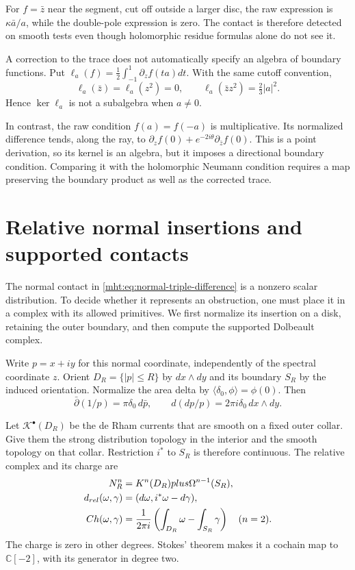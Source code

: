 For $f=\bar z$ near the segment, cut off outside a larger
disc, the raw expression is $\kappa\bar a/a$, while the
double-pole expression is zero. The contact is therefore
detected on smooth tests even though holomorphic residue
formulas alone do not see it.

A correction to the trace does not automatically specify an
algebra of boundary functions. Put
$\ell_a(f)=\frac12\int_{-1}^{1}\partial_zf(ta)dt$.
With the same cutoff convention,
\begin{equation}\label{mht:eq:segment-kernel-defect}
 \ell_a(\bar z)=\ell_a(z^2)=0,
 \qquad \ell_a(\bar z z^2)=\tfrac23|a|^2.
\end{equation}
Hence $\ker\ell_a$ is not a subalgebra when $a\ne0$.

In contrast, the raw condition $f(a)=f(-a)$ is multiplicative.
Its normalized difference tends, along the ray, to
$\partial_zf(0)+e^{-2i\theta}\partial_{\bar z}f(0)$.
This is a point derivation, so its kernel is an algebra, but
it imposes a directional boundary condition. Comparing it
with the holomorphic Neumann condition requires a map
preserving the boundary product as well as the corrected trace.

\section{Relative normal insertions and supported contacts}

The normal contact in \eqref{mht:eq:normal-triple-difference} is a
nonzero scalar distribution. To decide whether it represents an
obstruction, one must place it in a complex with its allowed
primitives. We first normalize its insertion on a disk, retaining the
outer boundary, and then compute the supported Dolbeault complex.

Write $p=x+iy$ for this normal coordinate, independently of the
spectral coordinate $z$. Orient $D_R=\{|p|\leq R\}$ by
$dx\wedge dy$ and its boundary $S_R$ by the induced orientation.
Normalize the area delta by $\langle\delta_0,\phi\rangle=\phi(0)$.
Then
\[
 \bar\partial(1/p)=\pi\delta_0\,d\bar p,\qquad
 d(dp/p)=2\pi i\delta_0\,dx\wedge dy.
\]

Let $\mathcal K^\bullet(D_R)$ be the de Rham currents that are
smooth on a fixed outer collar. Give them the strong distribution
topology in the interior and the smooth topology on that collar.
Restriction $i^*$ to $S_R$ is therefore continuous. The relative
complex and its charge are
\begin{align}
 \mathcal N_R^n
   &=\mathcal K^n(D_R)\oplus\Omega^{n-1}(S_R),\notag\\
 d_{\mathrm{rel}}(\omega,\gamma)
   &=(d\omega,i^*\omega-d\gamma),\notag\\
 \operatorname{Ch}(\omega,\gamma)
   &=\frac1{2\pi i}
       \left(\int_{D_R}\omega-\int_{S_R}\gamma\right)
       \quad(n=2).
       \label{mht:eq:relative-normal-charge}
\end{align}
The charge is zero in other degrees. Stokes' theorem makes it a
cochain map to $\mathbb C[-2]$, with its generator in degree two.

